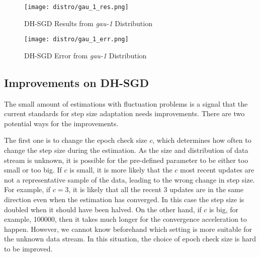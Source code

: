 \begin{figure}[H]
    \centering
	\texttt{[image: distro/gau\_1\_res.png]}
    \caption{DH-SGD Results from  \textit{gau-1} Distribution}
    \label{fig: DH_SGD_res}

\end{figure}

\begin{figure}[H]
    \centering
	\texttt{[image: distro/gau\_1\_err.png]}
    \caption{DH-SGD Error from \textit{gau-1} Distribution}
    \label{fig: DH_SGD_err}

\end{figure}

\subsection{Improvements on DH-SGD}

The small amount of estimations with fluctuation problems is a signal that the current standards for step size adaptation needs improvements. There are two potential ways for the improvements.

The first one is to change the epoch check size $c$, which determines how often to change the step size during the estimation. As the size and distribution of data stream is unknown, it is possible for the pre-defined parameter to be either too small or too big. If $c$ is small, it is more likely that the $c$ most recent updates are not a representative sample of the data, leading to the wrong change in step size. For example, if $c = 3$, it is likely that all the recent $3$ updates are in the same direction even when the estimation has converged. In this case the step size is doubled when it should have been halved. On the other hand, if $c$ is big, for example, 100000, then it takes much longer for the convergence acceleration to happen. However, we cannot know beforehand which setting is more suitable for the unknown data stream. In this situation, the choice of epoch check size is hard to be improved.


